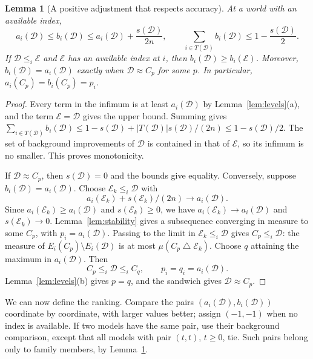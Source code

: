 \documentclass[11pt]{article}
\newtheorem{lemma}[theorem]{Lemma}
\theoremstyle{remark}
\newcommand{\sd}{\mathbin{\triangle}}
\newcommand{\Dscr}{\mathcal D}
\newcommand{\Escr}{\mathcal E}
\begin{document}
\begin{lemma}[A positive adjustment that respects accuracy]\label{lem:reserve}
At a world with an available index,
\begin{equation}
 a_i(\Dscr)\le b_i(\Dscr)\le a_i(\Dscr)+\frac{s(\Dscr)}{2n},\qquad
 \sum_{i\in T(\Dscr)}b_i(\Dscr)\le1-\frac{s(\Dscr)}2.
 \label{eq:budget}
\end{equation}
If $\Dscr\le_i\Escr$ and $\Escr$ has an available index at $i$, then $b_i(\Dscr)\ge b_i(\Escr)$.
Moreover, $b_i(\Dscr)=a_i(\Dscr)$ exactly when $\Dscr\approx C_{p}$ for some $p$.
In particular, $a_i(C_{p})=b_i(C_{p})=p_i$.
\end{lemma}
\begin{proof}
Every term in the infimum is at least $a_i(\Dscr)$ by Lemma~\ref{lem:levels}(a),
and the term $\Escr=\Dscr$ gives the upper bound. Summing gives
$\sum_{i\in T(\Dscr)}b_i(\Dscr)\le1-s(\Dscr)+|T(\Dscr)|s(\Dscr)/(2n)\le1-s(\Dscr)/2$.
The set of background improvements of $\Dscr$ is contained in that of $\Escr$,
so its infimum is no smaller. This proves monotonicity.

If $\Dscr\approx C_{p}$, then $s(\Dscr)=0$ and the bounds give equality.
Conversely, suppose $b_i(\Dscr)=a_i(\Dscr)$. Choose $\Escr_k\le_i\Dscr$ with
\[
 a_i(\Escr_k)+s(\Escr_k)/(2n)\longrightarrow a_i(\Dscr).
\]
Since $a_i(\Escr_k)\ge a_i(\Dscr)$ and $s(\Escr_k)\ge0$, we have
$a_i(\Escr_k)\to a_i(\Dscr)$ and $s(\Escr_k)\to0$.
Lemma~\ref{lem:stability} gives a subsequence converging in measure to some
$C_{p}$, with $p_i=a_i(\Dscr)$. Passing to the limit in $\Escr_k\le_i\Dscr$ gives
$C_{p}\le_i\Dscr$: the measure of $E_i(C_{p})\setminus E_i(\Dscr)$ is at most
$\mu(C_{p}\sd \Escr_k)$. Choose $q$ attaining the maximum in $a_i(\Dscr)$. Then
\[
 C_{p}\le_i\Dscr\le_iC_{q},\qquad p_i=q_i=a_i(\Dscr).
\]
Lemma~\ref{lem:levels}(b) gives $p=q$, and the sandwich gives $\Dscr\approx C_{p}$.
\end{proof}

We can now define the ranking. Compare the pairs
$(a_i(\Dscr),b_i(\Dscr))$ coordinate by coordinate, with larger values better;
assign $(-1,-1)$ when no index is available. If two models have the same pair,
use their background comparison, except that all models with pair $(t,t)$,
$t\ge0$, tie. Such pairs belong only to family members, by
Lemma~\ref{lem:reserve}.
\end{document}
